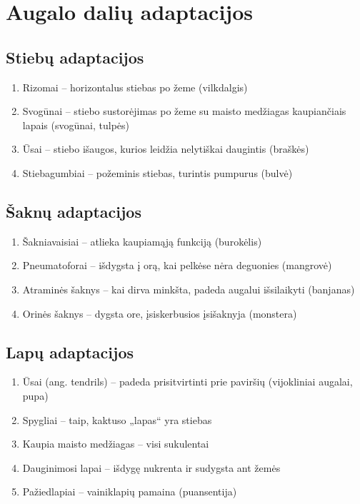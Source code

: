 \documentclass[]{book}
\providecommand{\tightlist}{%
  \setlength{\itemsep}{0pt}\setlength{\parskip}{0pt}}
\begin{document}
\hypertarget{augalo-daliu-adaptacijos}{%
\section{Augalo dalių adaptacijos}\label{augalo-daliu-adaptacijos}}

\hypertarget{stiebu-adaptacijos}{%
\subsection{Stiebų adaptacijos}\label{stiebu-adaptacijos}}

\begin{enumerate}
\def\labelenumi{\arabic{enumi}.}
\tightlist
\item
  Rizomai -- horizontalus stiebas po žeme (vilkdalgis)
\item
  Svogūnai -- stiebo sustorėjimas po žeme su maisto medžiagas kaupiančiais lapais (svogūnai, tulpės)
\item
  Ūsai -- stiebo išaugos, kurios leidžia nelytiškai daugintis (braškės)
\item
  Stiebagumbiai -- požeminis stiebas, turintis pumpurus (bulvė)
\end{enumerate}

\hypertarget{saknu-adaptacijos}{%
\subsection{Šaknų adaptacijos}\label{saknu-adaptacijos}}

\begin{enumerate}
\def\labelenumi{\arabic{enumi}.}
\tightlist
\item
  Šakniavaisiai -- atlieka kaupiamąją funkciją (burokėlis)
\item
  Pneumatoforai -- išdygsta į orą, kai pelkėse nėra deguonies (mangrovė)
\item
  Atraminės šaknys -- kai dirva minkšta, padeda augalui išsilaikyti (banjanas)
\item
  Orinės šaknys -- dygsta ore, įsiskerbusios įsišaknyja (monstera)
\end{enumerate}

\hypertarget{lapu-adaptacijos}{%
\subsection{Lapų adaptacijos}\label{lapu-adaptacijos}}

\begin{enumerate}
\def\labelenumi{\arabic{enumi}.}
\tightlist
\item
  Ūsai (ang. tendrils) -- padeda prisitvirtinti prie paviršių (vijokliniai augalai, pupa)
\item
  Spygliai -- taip, kaktuso „lapas`` yra stiebas
\item
  Kaupia maisto medžiagas -- visi sukulentai
\item
  Dauginimosi lapai -- išdygę nukrenta ir sudygsta ant žemės
\item
  Pažiedlapiai -- vainiklapių pamaina (puansentija)
\end{enumerate}
\end{document}

